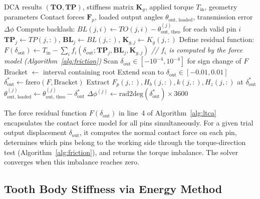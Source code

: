 \documentclass{article}
\begin{document}
\begin{algorithm}[t]
\caption{LTCA: Loaded Force-Balance Solver}\label{alg:ltca}
\begin{algorithmic}[1]
\Require DCA results $(\mathbf{TO}, \mathbf{TP})$, stiffness matrix $\mathbf{K}_g$, applied torque $T_\text{in}$, geometry parameters
\Ensure Contact forces $\mathbf{F}_p$, loaded output angles $\theta_\text{out, loaded}$, transmission error $\Delta\phi$
    \State Compute backlash: $BL(j,i) \gets TO(j,i) - \theta_\text{out, theo}^{(j)}$ for each valid pin $i$
    \State $\mathbf{TP}_j \gets TP(j,:)$, $\mathbf{BL}_j \gets BL(j,:)$, $\mathbf{K}_{g,j} \gets K_g(j,:)$
    \State Define residual function: $F(\delta_\text{out}) \gets T_\text{in} - \sum_i f_i(\delta_\text{out}; \mathbf{TP}_j, \mathbf{BL}_j, \mathbf{K}_{g,j})$
    \Statex \hspace{2.5em} \textit{// $f_i$ is computed by the force model (Algorithm~\ref{alg:friction})}
    \State Scan $\delta_\text{out} \in [-10^{-4}, 10^{-4}]$ for sign change of $F$
        \State Bracket $\gets$ interval containing root
    \Else
        \State Extend scan to $\delta_\text{out} \in [-0.01, 0.01]$
    \EndIf
    \State $\delta_\text{out}^* \gets \text{fzero}(F, \text{Bracket})$ 
    \State Extract $F_p(j,:), H_b(j,:), k(j,:), H_z(j,:)$ at $\delta_\text{out}^*$
    \State $\theta_\text{out, loaded}^{(j)} \gets \theta_\text{out, theo}^{(j)} - \delta_\text{out}^*$
    \State $\Delta\phi^{(j)} \gets \text{rad2deg}(\delta_\text{out}^*) \times 3600$ 
\EndFor
\end{algorithmic}
\end{algorithm}

The force residual function $F(\delta_\text{out})$ in line~4 of Algorithm~\ref{alg:ltca} encapsulates the contact force model for all pins simultaneously. For a given trial output displacement $\delta_\text{out}$, it computes the normal contact force on each pin, determines which pins belong to the working side through the torque-direction test (Algorithm~\ref{alg:friction}), and returns the torque imbalance. The solver converges when this imbalance reaches zero.

\subsection{Tooth Body Stiffness via Energy Method}
\label{sec:alg_stiffness}
\end{document}
